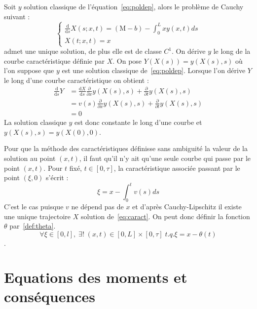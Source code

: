 \documentclass[a4paper]{article}
\newcommand{\mass}{\mathrm{M}}
\newcommand{\dep}{b}
\begin{document}
\begin{preuve}
	Soit $y$ solution classique de l'équation~\eqref{eq:poldep}, 
	alors le problème de Cauchy suivant :
	\begin{equation}
	\begin{cases}
		\label{eq:caract}
		\displaystyle \frac{\mathrm{d}}{\mathrm{d}s} X(s;x,t)= (\mass - \dep) - \int_0^L x y(x,t)ds\\
		X(t;x,t) = x
	\end{cases}
	\end{equation}
	admet une unique solution, de plus elle est de classe $C^1$.
	On dérive $y$ le long de la courbe caractéristique définie par $X$.
	On pose $Y(X(s))=y(X(s),s)$ où l'on suppose que $y$ est une solution classique de~\eqref{eq:poldep}.
	Lorsque l'on dérive $Y$ le long d'une courbe caractéristique on obtient :
	\[ 
	\begin{split}
		\frac{\mathrm{d}}{\mathrm{d}s} Y & = \frac{\mathrm{d} X }{\mathrm{d}s} \frac{\partial}{\partial x}y(X(s),s) + \frac{\partial}{\partial t}y(X(s),s) \\
		                                 & = v(s) \frac{\partial}{\partial x} y(X(s),s) + \frac{\partial}{\partial t} y(X(s),s)\\
										 & =0 
	\end{split}
		\]
	La solution classique $y$ est donc constante le long d'une courbe et $y(X(s),s) = y(X(0),0)$.
	
\end{preuve}

\begin{remarque}
	Pour que la méthode des caractéristiques définisse sans ambiguité la valeur de la solution au point $(x,t)$, 
	il faut qu'il n'y ait qu'une seule courbe qui passe par le point $(x,t)$.
	Pour $t$ fixé, $t \in [0,\tau]$, la caractéristique associée passant par le point $(\xi,0)$ s'écrit :
	\[ \xi = x - \int_0^t v(s)ds \]
	C'est le cas puisque $v$ ne dépend pas de $x$ et d'après Cauchy-Lipschitz il existe une unique trajectoire $X$ solution de~\eqref{eq:caract}. On peut donc définir la fonction $\theta$ par~\eqref{def:theta}.
	\[ \forall \xi \in [0,l], \; \exists ! \; (x,t) \in [0,L]\times[0,\tau] \; t.q. \xi = x - \theta(t) \].
\end{remarque}



\section{Equations des moments et conséquences}
\end{document}
